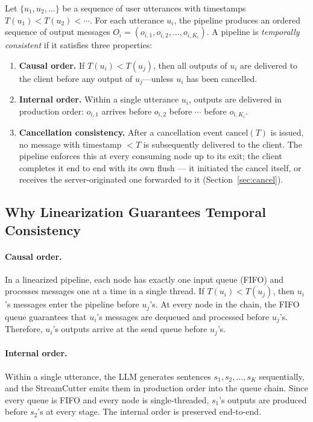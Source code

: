 \documentclass[11pt,a4paper]{article}
\begin{document}
Let $\{u_1, u_2, \ldots\}$ be a sequence of user utterances with timestamps $T(u_1) < T(u_2) < \cdots$. For each utterance $u_i$, the pipeline produces an ordered sequence of output messages $O_i = (o_{i,1}, o_{i,2}, \ldots, o_{i,K_i})$. A pipeline is \emph{temporally consistent} if it satisfies three properties:

\begin{enumerate}[nosep]
    \item \textbf{Causal order.} If $T(u_i) < T(u_j)$, then all outputs of $u_i$ are delivered to the client before any output of $u_j$---unless $u_i$ has been cancelled.
    \item \textbf{Internal order.} Within a single utterance $u_i$, outputs are delivered in production order: $o_{i,1}$ arrives before $o_{i,2}$ before $\cdots$ before $o_{i,K_i}$.
    \item \textbf{Cancellation consistency.} After a cancellation event $\text{cancel}(T)$ is issued, no message with timestamp $< T$ is subsequently delivered to the client. The pipeline enforces this at every consuming node up to its exit; the client completes it end to end with its own flush --- it initiated the cancel itself, or receives the server-originated one forwarded to it (Section~\ref{sec:cancel}).
\end{enumerate}

\subsection{Why Linearization Guarantees Temporal Consistency}

\paragraph{Causal order.}
In a linearized pipeline, each node has exactly one input queue (FIFO) and processes messages one at a time in a single thread. If $T(u_i) < T(u_j)$, then $u_i$'s messages enter the pipeline before $u_j$'s. At every node in the chain, the FIFO queue guarantees that $u_i$'s messages are dequeued and processed before $u_j$'s. Therefore, $u_i$'s outputs arrive at the send queue before $u_j$'s.

\paragraph{Internal order.}
Within a single utterance, the LLM generates sentences $s_1, s_2, \ldots, s_K$ sequentially, and the StreamCutter emits them in production order into the queue chain. Since every queue is FIFO and every node is single-threaded, $s_1$'s outputs are produced before $s_2$'s at every stage. The internal order is preserved end-to-end.
\end{document}
